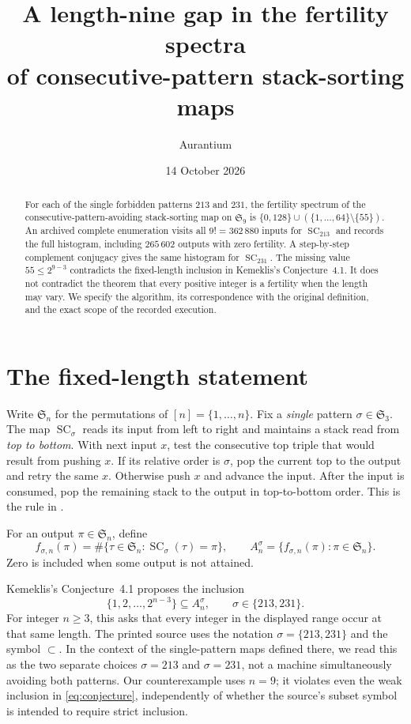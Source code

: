 \documentclass[11pt,a4paper]{article}
\title{A length-nine gap in the fertility spectra\protect\\of consecutive-pattern stack-sorting maps}
\author{Aurantium}
\date{14 October 2026}
\newcommand{\SC}{\operatorname{SC}}
\newcommand{\Sn}{\mathfrak S_n}
\begin{document}
\maketitle
\begin{abstract}
For each of the single forbidden patterns $213$ and $231$, the fertility
spectrum of the consecutive-pattern-avoiding stack-sorting map on
$\mathfrak S_9$ is
$\{0,128\}\cup(\{1,\ldots,64\}\setminus\{55\})$.
An archived complete enumeration visits all $9!=362\,880$ inputs for
$\SC_{213}$ and records the full histogram, including $265\,602$ outputs
with zero fertility. A step-by-step complement conjugacy gives the same
histogram for $\SC_{231}$. The missing value $55\le2^{9-3}$ contradicts
the fixed-length inclusion in Kemeklis's Conjecture~4.1. It does not
contradict the theorem that every positive integer is a fertility when
the length may vary. We specify the algorithm, its correspondence with
the original definition, and the exact scope of the recorded execution.
\end{abstract}

\section{The fixed-length statement}
Write $\Sn$ for the permutations of $[n]=\{1,\ldots,n\}$. Fix a
\emph{single} pattern $\sigma\in\mathfrak S_3$. The map $\SC_\sigma$
reads its input from left to right and maintains a stack read from
\emph{top to bottom}. With next input $x$, test the consecutive top
triple that would result from pushing $x$. If its relative order is
$\sigma$, pop the current top to the output and retry the same $x$.
Otherwise push $x$ and advance the input. After the input is consumed,
pop the remaining stack to the output in top-to-bottom order. This is
the rule in \cite[p.~1]{K}.

For an output $\pi\in\Sn$, define
\[
 f_{\sigma,n}(\pi)=\#\{\tau\in\Sn:\SC_\sigma(\tau)=\pi\},
 \qquad A_n^\sigma=\{f_{\sigma,n}(\pi):\pi\in\Sn\}.
\]
Zero is included when some output is not attained.

Kemeklis's Conjecture~4.1 \cite[p.~11]{K} proposes the inclusion
\begin{equation}\label{eq:conjecture}
 \{1,2,\ldots,2^{n-3}\}\subseteq A_n^\sigma,
 \qquad \sigma\in\{213,231\}.
\end{equation}
For integer $n\ge3$, this asks that every integer in the displayed
range occur at that same length. The printed source uses the notation
$\sigma=\{213,231\}$ and the symbol $\subset$. In the context of the
single-pattern maps defined there, we read this as the two separate
choices $\sigma=213$ and $\sigma=231$, not a machine simultaneously
avoiding both patterns. Our counterexample uses $n=9$; it violates even
the weak inclusion in \eqref{eq:conjecture}, independently of whether
the source's subset symbol is intended to require strict inclusion.
\end{document}
